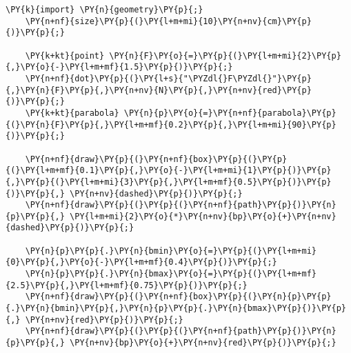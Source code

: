 \begin{Verbatim}[commandchars=\\\{\}]
    \PY{k}{import} \PY{n}{geometry}\PY{p}{;}
    \PY{n+nf}{size}\PY{p}{(}\PY{l+m+mi}{10}\PY{n+nv}{cm}\PY{p}{)}\PY{p}{;}

    \PY{k+kt}{point} \PY{n}{F}\PY{o}{=}\PY{p}{(}\PY{l+m+mi}{2}\PY{p}{,}\PY{o}{-}\PY{l+m+mf}{1.5}\PY{p}{)}\PY{p}{;}
    \PY{n+nf}{dot}\PY{p}{(}\PY{l+s}{"\PYZdl{}F\PYZdl{}"}\PY{p}{,}\PY{n}{F}\PY{p}{,}\PY{n+nv}{N}\PY{p}{,}\PY{n+nv}{red}\PY{p}{)}\PY{p}{;}
    \PY{k+kt}{parabola} \PY{n}{p}\PY{o}{=}\PY{n+nf}{parabola}\PY{p}{(}\PY{n}{F}\PY{p}{,}\PY{l+m+mf}{0.2}\PY{p}{,}\PY{l+m+mi}{90}\PY{p}{)}\PY{p}{;}

    \PY{n+nf}{draw}\PY{p}{(}\PY{n+nf}{box}\PY{p}{(}\PY{p}{(}\PY{l+m+mf}{0.1}\PY{p}{,}\PY{o}{-}\PY{l+m+mi}{1}\PY{p}{)}\PY{p}{,}\PY{p}{(}\PY{l+m+mi}{3}\PY{p}{,}\PY{l+m+mf}{0.5}\PY{p}{)}\PY{p}{)}\PY{p}{,} \PY{n+nv}{dashed}\PY{p}{)}\PY{p}{;}
    \PY{n+nf}{draw}\PY{p}{(}\PY{p}{(}\PY{n+nf}{path}\PY{p}{)}\PY{n}{p}\PY{p}{,} \PY{l+m+mi}{2}\PY{o}{*}\PY{n+nv}{bp}\PY{o}{+}\PY{n+nv}{dashed}\PY{p}{)}\PY{p}{;}

    \PY{n}{p}\PY{p}{.}\PY{n}{bmin}\PY{o}{=}\PY{p}{(}\PY{l+m+mi}{0}\PY{p}{,}\PY{o}{-}\PY{l+m+mf}{0.4}\PY{p}{)}\PY{p}{;}
    \PY{n}{p}\PY{p}{.}\PY{n}{bmax}\PY{o}{=}\PY{p}{(}\PY{l+m+mf}{2.5}\PY{p}{,}\PY{l+m+mf}{0.75}\PY{p}{)}\PY{p}{;}
    \PY{n+nf}{draw}\PY{p}{(}\PY{n+nf}{box}\PY{p}{(}\PY{n}{p}\PY{p}{.}\PY{n}{bmin}\PY{p}{,}\PY{n}{p}\PY{p}{.}\PY{n}{bmax}\PY{p}{)}\PY{p}{,} \PY{n+nv}{red}\PY{p}{)}\PY{p}{;}
    \PY{n+nf}{draw}\PY{p}{(}\PY{p}{(}\PY{n+nf}{path}\PY{p}{)}\PY{n}{p}\PY{p}{,} \PY{n+nv}{bp}\PY{o}{+}\PY{n+nv}{red}\PY{p}{)}\PY{p}{;}
\end{Verbatim}
